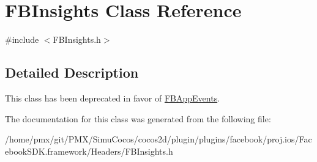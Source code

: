 \hypertarget{classFBInsights}{}\section{F\+B\+Insights Class Reference}
\label{classFBInsights}


{\ttfamily \#include $<$F\+B\+Insights.\+h$>$}



\subsection{Detailed Description}
This class has been deprecated in favor of \hyperlink{interfaceFBAppEvents}{F\+B\+App\+Events}. 

The documentation for this class was generated from the following file\+:\begin{DoxyCompactItemize}
\item 
/home/pmx/git/\+P\+M\+X/\+Simu\+Cocos/cocos2d/plugin/plugins/facebook/proj.\+ios/\+Facebook\+S\+D\+K.\+framework/\+Headers/F\+B\+Insights.\+h\end{DoxyCompactItemize}
